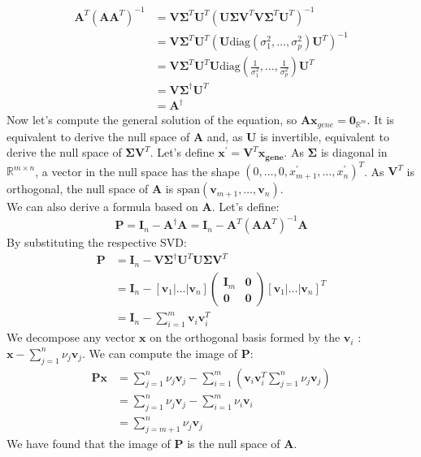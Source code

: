 \documentclass{article}
\begin{document}
\begin{align*}
\mathbf{A}^T (\mathbf{A} \mathbf{A}^T)^{-1} &=   \mathbf{V}  \boldsymbol{\Sigma}^T \mathbf{U}^T(   \mathbf{U}  \boldsymbol{\Sigma} \mathbf{V}^T      \mathbf{V}  \boldsymbol{\Sigma}^T \mathbf{U}^T)^{-1}\\
&=   \mathbf{V}  \boldsymbol{\Sigma}^T \mathbf{U}^T(   \mathbf{U}  \text{diag}(\sigma_1^2, \dots, \sigma_p^2)  \mathbf{U}^T)^{-1}\\
&=   \mathbf{V}  \boldsymbol{\Sigma}^T \mathbf{U}^T   \mathbf{U}  \text{diag}(\frac{1}{\sigma_1^2}, \dots, \frac{1}{\sigma_p^2})  \mathbf{U}^T\\
&= \mathbf{V}  \boldsymbol{\Sigma^\dagger} \mathbf{U}^T\\
&= \mathbf{A}^\dagger
\end{align*}
Now let's compute the general solution of the equation, so $\mathbf{A} \mathbf{x}_{gene} = \mathbf{0}_{  \mathbb{R}^{m} }$. It is equivalent to derive the null space of $\mathbf{A}$ and, as $\mathbf{U}$ is invertible, equivalent to derive the null space of $\boldsymbol{\Sigma} \mathbf{V}^T$. Let's define $  \mathbf{x}^\prime =  \mathbf{V}^T \mathbf{x_{gene}} $. As $\boldsymbol{\Sigma} $ is diagonal in $\mathbb{R}^{m \times n}$, a vector in the null space has the shape $(0,\dots,0,x^\prime_{m+1}, \dots , x^\prime_{n})^T$. As $\mathbf{V}^T$ is orthogonal, the null space of  $\mathbf{A}$ is $\text{span}(\mathbf{v}_{m+1}, \dots , \mathbf{v}_{n})$.\\

We can also derive a formula based on $\mathbf{A}$. Let's define:
\[\mathbf{P}=\mathbf{I}_n-\mathbf{A}^\dagger\mathbf{A}=\mathbf{I}_n-\mathbf{A}^T (\mathbf{A} \mathbf{A}^T)^{-1} \mathbf{A}
\]
By substituting the respective SVD:
\begin{align*}
\mathbf{P}&=\mathbf{I}_n-\mathbf{V}  \boldsymbol{\Sigma^\dagger} \mathbf{U}^T\mathbf{U}  \boldsymbol{\Sigma} \mathbf{V}^T\\
&=\mathbf{I}_n-[\mathbf{v}_1 | \dots | \mathbf{v}_n]\begin{pmatrix}
\mathbf{I}_m &  \mathbf{0} \\
\mathbf{0} & \mathbf{0}
\end{pmatrix}[\mathbf{v}_1 | \dots | \mathbf{v}_n]^T\\
&=\mathbf{I}_n-\sum_{i=1}^m\mathbf{v}_i\mathbf{v}_i^T
\end{align*}
We decompose any vector $\mathbf{x}$ on the orthogonal basis formed by the $\mathbf{v}_i$ : $\mathbf{x}-\sum_{j=1}^n\nu_j\mathbf{v}_j$. We can compute the image of $\mathbf{P}$:
\begin{align*}
\mathbf{P}\mathbf{x}&=\sum_{j=1}^n\nu_j\mathbf{v}_j-\sum_{i=1}^m\left(\mathbf{v}_i\mathbf{v}_i^T\sum_{j=1}^n\nu_j\mathbf{v}_j\right)\\
&=\sum_{j=1}^n\nu_j\mathbf{v}_j-\sum_{i=1}^m\nu_i\mathbf{v}_i\\
&=\sum_{j={m+1}}^n\nu_j\mathbf{v}_j
\end{align*}
We have found that the image of $\mathbf{P}$ is the null space of $\mathbf{A}$.
\end{document}

